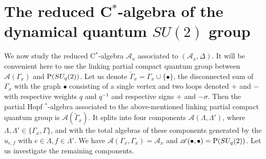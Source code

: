 




\section{The reduced C$^*$-algebra of the dynamical quantum $SU(2)$ group}

We now study the reduced C$^*$-algebra $\mathcal{A}_x$ associated to $(\mathscr{A}_x,\Delta)$. It will be convenient here to use the linking partial compact quantum group between $\mathscr{A}(\Gamma_x)$ and $\operatorname{\mathrm{P}}(SU_q(2))$.  Let us denote $\widetilde{\Gamma}_x = \Gamma_x\cup \{\bullet\}$, the disconnected sum of $\Gamma_x$ with the graph $\bullet$ consisting of a single vertex and two loops denoted $+$ and $-$ with respective weights $q$ and $q^{-1}$ and respective signs $+$ and $-\sigma$. Then the partial Hopf $^*$-algebra associated to the above-mentioned linking partial compact quantum group is $\mathscr{A}(\widetilde{\Gamma}_x)$. It splits into four components $\mathscr{A}(\Lambda,\Lambda')$, where $\Lambda,\Lambda' \in \{\Gamma_x,\Gamma\}$, and with the total algebras of these components generated by the $u_{e,f}$ with $e \in \Lambda,f\in \Lambda'$. We have $\mathscr{A}(\Gamma_x,\Gamma_x) = \mathscr{A}_x$ and $\mathscr{A}(\bullet,\bullet) = \operatorname{\mathrm{P}}(SU_q(2))$. Let us investigate the remaining components.

